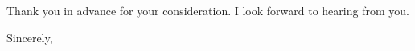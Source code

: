 \documentclass{letter}
\begin{document}
\begin{letter}{\employer}
  Thank you in advance for your consideration.
  I look forward to hearing from you.
  



  \closing{Sincerely,}
\end{letter}
\end{document}
